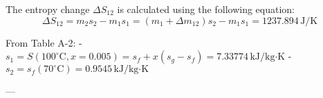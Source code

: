 The entropy change \( \Delta S_{12} \) is calculated using the following equation:  
\[
\Delta S_{12} = m_2 s_2 - m_1 s_1 = (m_1 + \Delta m_{12}) s_2 - m_1 s_1 = 1237.894 \, \text{J/K}
\]  

From Table A-2:  
- \( s_1 = S(100^\circ\text{C}, x = 0.005) = s_f + x(s_g - s_f) = 7.33774 \, \text{kJ/kg·K} \)  
- \( s_2 = s_f(70^\circ\text{C}) = 0.9545 \, \text{kJ/kg·K} \)  

---